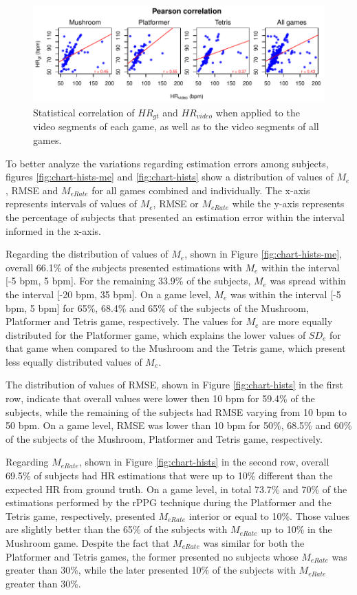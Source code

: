 \begin{figure}[!h]
\centering
\includegraphics[width=\columnwidth]{figures/correlation-hrgt-hrvideo.pdf}
\caption{Statistical correlation of $HR_{gt}$ and $HR_{video}$ when applied to the video segments of each game, as well as to the video segments of all games.}
\label{fig:chart-r-games}
\end{figure}

To better analyze the variations regarding estimation errors among subjects, figures \ref{fig:chart-hists-me} and \ref{fig:chart-hists} show a distribution of values of $M_e$, RMSE and $M_{eRate}$ for all games combined and individually. The x-axis represents intervals of values of $M_e$, RMSE or $M_{eRate}$ while the y-axis represents the percentage of subjects that presented an estimation error within the interval informed in the x-axis.

Regarding the distribution of values of $M_e$, shown in Figure \ref{fig:chart-hists-me}, overall 66.1\% of the subjects presented estimations with $M_e$ within the interval [-5 bpm, 5 bpm]. For the remaining 33.9\% of the subjects, $M_e$ was spread within the interval [-20 bpm, 35 bpm]. On a game level, $M_e$ was within the interval [-5 bpm, 5 bpm] for 65\%, 68.4\% and 65\% of the subjects of the Mushroom, Platformer and Tetris game, respectively. The values for $M_e$ are more equally distributed for the Platformer game, which explains the lower values of $SD_e$ for that game when compared to the Mushroom and the Tetris game, which present less equally distributed values of $M_e$.

The distribution of values of RMSE, shown in Figure \ref{fig:chart-hists} in the first row, indicate that overall values were lower then 10 bpm for 59.4\% of the subjects, while the remaining of the subjects had RMSE varying from 10 bpm to 50 bpm. On a game level, RMSE was lower than 10 bpm for 50\%, 68.5\% and 60\% of the subjects of the Mushroom, Platformer and Tetris game, respectively.

Regarding $M_{eRate}$, shown in Figure \ref{fig:chart-hists} in the second row, overall 69.5\% of subjects had HR estimations that were up to 10\% different than the expected HR from ground truth. On a game level, in total 73.7\% and 70\% of the estimations performed by the rPPG technique during the Platformer and the Tetris game, respectively, presented $M_{eRate}$ interior or equal to 10\%. Those values are slightly better than the 65\% of the subjects with $M_{eRate}$ up to 10\% in the Mushroom game. Despite the fact that $M_{eRate}$ was similar for both the Platformer and Tetris games, the former presented no subjects whose $M_{eRate}$ was greater than 30\%, while the later presented 10\% of the subjects with $M_{eRate}$ greater than 30\%.

